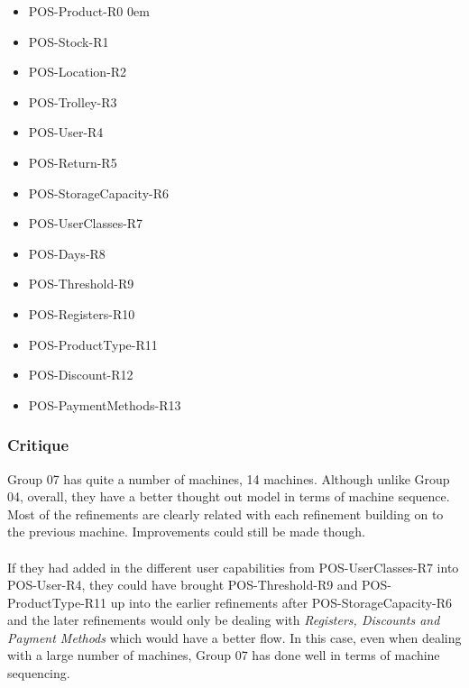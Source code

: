 \begin{itemize}
\item POS-Product-R0
 \itemsep0em 

\item POS-Stock-R1

\item POS-Location-R2

\item POS-Trolley-R3

\item POS-User-R4

\item POS-Return-R5

\item POS-StorageCapacity-R6

\item POS-UserClasses-R7

\item POS-Days-R8

\item POS-Threshold-R9

\item POS-Registers-R10

\item POS-ProductType-R11

\item POS-Discount-R12

\item POS-PaymentMethods-R13

\end{itemize}

\subsubsection{Critique}
\label{critique}

Group 07 has quite a number of machines, 14 machines. Although unlike Group 04, overall, they have a better thought out model in terms of machine sequence. Most of the refinements are clearly related with each refinement building on to the previous machine. Improvements could still be made though.  \\ \\  If they had added in the different user capabilities from POS-UserClasses-R7 into POS-User-R4, they could have brought POS-Threshold-R9 and POS-ProductType-R11 up into the earlier refinements after POS-StorageCapacity-R6 and the later refinements would only be dealing with \emph{Registers, Discounts and Payment Methods} which would have a better flow. In this case, even when dealing with a large number of machines, Group 07 has done well in terms of machine sequencing.

